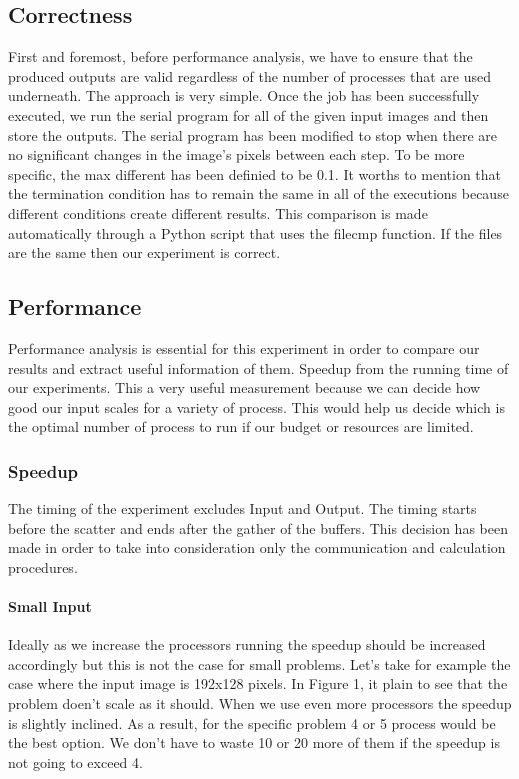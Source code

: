 \documentclass[12pt,a4paper]{article}
\begin{document}
    \subsection{Correctness}
        First and foremost, before performance analysis, we have to ensure that the produced outputs are valid regardless of the number of processes that are used underneath. The approach is very simple. Once the job has been successfully executed, we run the serial program for all of the given input images and then store the outputs. The serial program has been modified to stop when there are no significant changes in the image's pixels between each step. To be more specific, the max different has been definied to be 0.1. It worths to mention that the termination condition has to remain the same in all of the executions because different conditions create different results. This comparison is made automatically through a Python script that uses the filecmp function. If the files are the same then our experiment is correct.


    \subsection{Performance}
        Performance analysis is essential for this experiment in order to compare our results and extract useful information of them. Speedup from the running time of our experiments. This a very useful measurement because we can decide how good our input scales for a variety of process. This would help us decide which is the optimal number of process to run if our budget or resources are limited.

        \subsubsection{Speedup}
            The timing of the experiment excludes Input and Output. The timing starts before the scatter and ends after the gather of the buffers. This decision has been made in order to take into consideration only the communication and calculation procedures.

            \paragraph{Small Input}
                Ideally as we increase the processors running the speedup should be increased accordingly but this is not the case for small problems. Let's take for example the case where the input image is 192x128 pixels. In Figure 1, it plain to see that the problem doen't scale as it should. When we use even more processors the speedup is slightly inclined. As a result, for the specific problem 4 or 5 process would be the best option. We don't have to waste 10 or 20 more of them if the speedup is not going to exceed 4.
\end{document}
